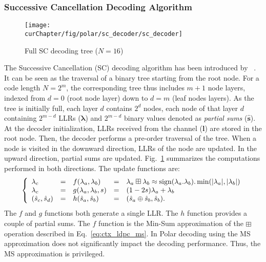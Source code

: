 \subsubsection{Successive Cancellation Decoding Algorithm}

\begin{figure}[htp]
  \centering
  \texttt{[image: \\curChapter/fig/polar/sc\_decoder/sc\_decoder]}
  \caption{Full SC decoding tree ($N = 16$)}
  \label{fig:ctx_polar_sc_decoder}
\end{figure}

The Successive Cancellation (SC) decoding algorithm has been introduced by
\Arikan~\cite{Arikan2009}. It can be seen as the traversal of a binary tree
starting from the root node. For a code length $N=2^m$, the corresponding tree
thus includes $m + 1$ node layers, indexed from $d=0$ (root node layer) down to
$d=m$ (leaf nodes layers). As the tree is initially full, each layer $d$
contains $2^d$ nodes, each node of that layer $d$ containing $2^{m-d}$ LLRs
($\bm{\lambda}$) and $2^{m-d}$ binary values denoted as \textit{partial sums}
($\bm{\hat{s}}$). At the decoder initialization, LLRs received from the channel
($\bm{l}$) are stored in the root node. Then, the decoder performs a pre-order
traversal of the tree. When a node is visited in the downward direction, LLRs of
the node are updated. In the upward direction, partial sums are updated.
Fig.~\ref{fig:ctx_polar_sc_decoder} summarizes the computations performed in
both directions. The update functions are:
\begin{eqnarray}
\left\{\begin{array}{l c l c l}
\lambda_c &=& f(\lambda_a,\lambda_b) &=& \lambda_a \boxplus \lambda_b \approx \operatorname*{sign}(\lambda_a.\lambda_b).\min(|\lambda_a|,|\lambda_b|)\\
\lambda_c &=& g(\lambda_a,\lambda_b,s)&=&(1-2s)\lambda_a+\lambda_b\\
(\hat{s}_{c}, \hat{s}_{d}) &=& h(\hat{s}_{a}, \hat{s}_{b}) &=& (\hat{s}_{a} \oplus \hat{s}_{b}, \hat{s}_{b}).
\end{array}\right.
\label{eq:ctx_polar_f_g_h}
\end{eqnarray}
The $f$ and $g$ functions both generate a single LLR. The $h$ function provides
a couple of partial sums. The $f$ function is the Min-Sum approximation of the
$\boxplus$ operation described in Eq.~\ref{eq:ctx_ldpc_ms}. In Polar decoding
using the MS approximation does not significantly impact the decoding
performance. Thus, the MS approximation is privileged.

